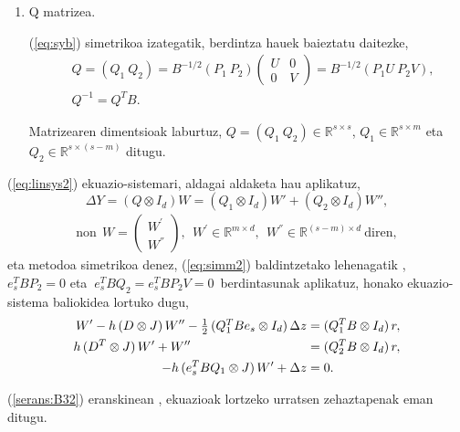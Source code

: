 \begin{enumerate}
\item Q matrizea.

(\ref{eq:syb}) simetrikoa izategatik, berdintza hauek baieztatu daitezke,
\begin{align}
&Q=(Q_1 \ Q_2)=
B^{-1/2}(P_1 \ P_2)
\left(
\begin{matrix}
U & 0 \\
0 & V
\end{matrix}
\right)=
B^{-1/2} (P_1U \ P_2V), \\
&Q^{-1}=Q^TB.
\end{align}  

Matrizearen dimentsioak laburtuz, $Q=(Q_1 \ Q_2) \in \mathbb{R}^{s \times s}$, $Q_1 \in \mathbb{R}^{s \times m}$ eta $Q_2 \in \mathbb{R}^{s \times (s-m)}$ ditugu.

\end{enumerate}

(\ref{eq:linsys2}) ekuazio-sistemari, aldagai aldaketa hau aplikatuz,
\begin{equation}
\label{eq:DeltaYChVar}
 \Delta Y = (Q \otimes I_d) W= (Q_1 \otimes I_d) W'+ (Q_2 \otimes I_d) W'',
\end{equation}
\begin{align*}
\text{non}  \ \ W=\left(
\begin{matrix}
W^{'} \\
W^{''} 
\end{matrix}
\right),\ \ W^{'} \in \mathbb{R}^{m \times d}, \ \ W^{''} \in \mathbb{R}^{(s-m) \times d} \ \text{diren},
\end{align*}
%
eta metodoa simetrikoa denez, (\ref{eq:simm2}) baldintzetako lehenagatik , $e_s^TBP_2=0$ eta $\ e_s^TBQ_2=e_s^TBP_2V=0$~berdintasunak aplikatuz, honako ekuazio-sistema baliokidea lortuko dugu,
\begin{equation}
\label{eq:linsys4}
  \begin{split}
       W' -h \, (D \otimes J)\,  W'' - \half\, (Q_1^T B e_s \otimes I_\dim) \, \Delta z &= (Q_1^T B \otimes I_\dim )\, r, \\
    h \, (D^T \otimes J)\, W'  + W'' \phantom{+\half\, (Q_2^T B e_s \otimes I_\dim) \, \Delta z  }
    &= (Q_2^T B \otimes I_\dim )\, r,\\
-h \, (e_s^T  B  Q_1 \otimes J) \, W' + \Delta z &= 0.
  \end{split}
\end{equation}

(\ref{serans:B32}) eranskinean , ekuazioak lortzeko urratsen zehaztapenak eman ditugu.

